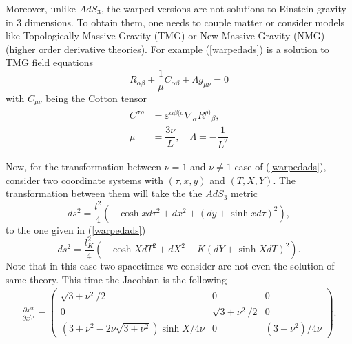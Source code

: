 \documentclass[preprint,aps,tightenlines,showkeys,nofootinbib,superscriptaddress,amsmath]{revtex4}
\begin{document}
Moreover, unlike $AdS_3$, the warped versions are not solutions to
Einstein gravity in 3 dimensions. To obtain them, one needs to couple
matter or consider models like Topologically Massive Gravity (TMG) or New
Massive Gravity (NMG) (higher order derivative theories). For example
(\ref{warpedads}) is a solution to TMG field equations
\begin{equation}
  R_{\alpha\beta}+\frac{1}{\mu } C_{\alpha \beta }+\Lambda g_{\mu  \nu }=0
\end{equation}
with $C_{\mu \nu }$ being the Cotton tensor
\begin{eqnarray}
  C^{\sigma \rho }&=\varepsilon^{\alpha \beta (\sigma }\nabla_{\alpha
  }R^{\rho) }{}_{\beta },\nonumber\\
  \mu &=\dfrac{3\nu}{L},\quad\Lambda=-\dfrac{1}{L^{2} }
\end{eqnarray}

Now, for the transformation between $\nu =1$ and $\nu \neq 1$ case of
(\ref{warpedads}), consider two coordinate systems with
$(\tau,x,y)$ and $(T,X,Y)$. The transformation between them will take
the the $AdS_3$ metric
\begin{equation}
  ds^{2}=\frac{l^{2}}{4}\left(-\cosh x d\tau^{2}+dx^{2}+(dy+\sinh
  x d\tau )^{2} \right),
\end{equation}
to the one given in (\ref{warpedads})
\begin{equation}
  ds^{2}=\dfrac{l^{2}_K}{4}\left(-\cosh X dT^{2}+dX^{2}+K(dY+\sinh
  X dT )^{2}   \right)\label{warpedads}.
\end{equation}
Note that in this case two spacetimes we consider are not even the
solution of same theory. This time the Jacobian is the following
\begin{eqnarray}
  \frac{\partial x^{\alpha} }{\partial x^{\prime\mu} }=
  \begin{pmatrix}
    \sqrt{3+\nu ^{2} }/2 & 0 & 0 \\
    0 & \sqrt{3+\nu ^{2} }/2  & 0 \\
    (3+\nu ^{2}-2 \nu \sqrt{3+\nu ^{2} }  )\sinh X / 4 \nu  & 0 &
    (3+\nu ^{2}) /4\nu
  \end{pmatrix}.
\end{eqnarray}
\end{document}
